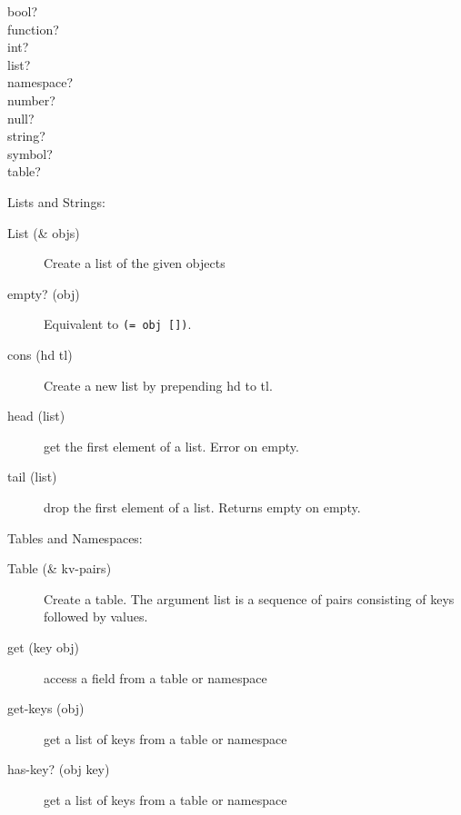 \documentclass[11pt]{article}
\begin{document}
\begin{description}
\item[{bool?}] 

\item[{function?}] 

\item[{int?}] 

\item[{list?}] 

\item[{namespace?}] 

\item[{number?}] 

\item[{null?}] 

\item[{string?}] 

\item[{symbol?}] 

\item[{table?}] 
\end{description}

Lists and Strings:
\begin{description}
\item[{List (\& objs)}] Create a list of the given objects
\item[{empty? (obj)}] Equivalent to \texttt{(= obj [])}.
\item[{cons (hd tl)}] Create a new list by prepending hd to tl.
\item[{head (list)}] get the first element of a list. Error on empty.
\item[{tail (list)}] drop the first element of a list. Returns empty on empty.
\end{description}

Tables and Namespaces:
\begin{description}
\item[{Table (\& kv-pairs)}] Create a table. The argument list is a sequence
of pairs consisting of keys followed by values.
\item[{get (key obj)}] access a field from a table or namespace
\item[{get-keys (obj)}] get a list of keys from a table or namespace
\item[{has-key? (obj key)}] get a list of keys from a table or namespace
\end{description}
\end{document}
